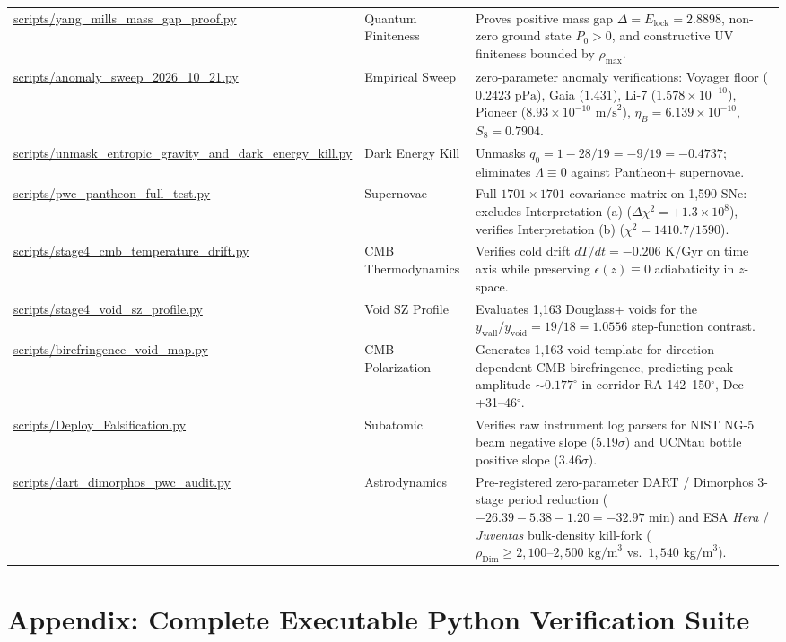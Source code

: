 \documentclass[11pt,a4paper]{article}
\begin{document}
\begin{table}[htbp]
\begin{tabularx}{\textwidth}{>{\raggedright\arraybackslash}p{4.3cm} l >{\raggedright\arraybackslash}X}
\url{scripts/yang_mills_mass_gap_proof.py} & Quantum Finiteness & Proves positive mass gap $\Delta = E_{\text{lock}} = 2.8898$, non-zero ground state $P_0 > 0$, and constructive UV finiteness bounded by $\rho_{\max}$. \\
\url{scripts/anomaly_sweep_2026_10_21.py} & Empirical Sweep & 11 zero-parameter anomaly verifications: Voyager floor ($0.2423\text{ pPa}$), Gaia ($1.431$), Li-7 ($1.578 \times 10^{-10}$), Pioneer ($8.93 \times 10^{-10}\text{ m/s}^2$), $\eta_B = 6.139 \times 10^{-10}$, $S_8 = 0.7904$. \\
\url{scripts/unmask_entropic_gravity_and_dark_energy_kill.py} & Dark Energy Kill & Unmasks $q_0 = 1 - 28/19 = -9/19 = -0.4737$; eliminates $\Lambda \equiv 0$ against Pantheon+ supernovae. \\
\url{scripts/pwc_pantheon_full_test.py} & Supernovae & Full $1701 \times 1701$ covariance matrix on 1,590 SNe: excludes Interpretation (a) ($\Delta\chi^2 = +1.3 \times 10^8$), verifies Interpretation (b) ($\chi^2 = 1410.7/1590$). \\
\url{scripts/stage4_cmb_temperature_drift.py} & CMB Thermodynamics & Verifies cold drift $dT/dt = -0.206\text{ K/Gyr}$ on time axis while preserving $\epsilon(z) \equiv 0$ adiabaticity in $z$-space. \\
\url{scripts/stage4_void_sz_profile.py} & Void SZ Profile & Evaluates 1,163 Douglass+ voids for the $y_{\text{wall}}/y_{\text{void}} = 19/18 = 1.0556$ step-function contrast. \\
\url{scripts/birefringence_void_map.py} & CMB Polarization & Generates 1,163-void template for direction-dependent CMB birefringence, predicting peak amplitude $\sim 0.177^\circ$ in corridor RA 142--150$^\circ$, Dec +31--46$^\circ$. \\
\url{scripts/Deploy_Falsification.py} & Subatomic & Verifies raw instrument log parsers for NIST NG-5 beam negative slope ($5.19\sigma$) and UCNtau bottle positive slope ($3.46\sigma$). \\
\url{scripts/dart_dimorphos_pwc_audit.py} & Astrodynamics & Pre-registered zero-parameter DART / Dimorphos 3-stage period reduction ($-26.39 - 5.38 - 1.20 = -32.97\text{ min}$) and ESA \textit{Hera} / \textit{Juventas} bulk-density kill-fork ($\rho_{\text{Dim}} \ge 2{,}100\text{--}2{,}500\text{ kg/m}^3$ vs.~$1{,}540\text{ kg/m}^3$). \\
\bottomrule
\end{tabularx}
\end{table}

\section{Appendix: Complete Executable Python Verification Suite}
\end{document}
